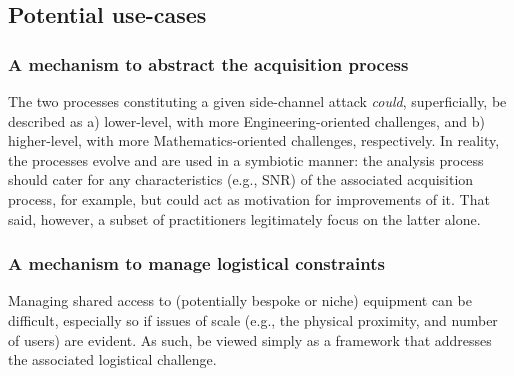 
\subsection{Potential use-cases}


\subsubsection{A mechanism to abstract the acquisition process}

The two processes constituting a given side-channel attack {\em could},
superficially, be described as
a)  lower-level, with more Engineering-oriented challenges,
   and
b) higher-level, with more Mathematics-oriented challenges,
respectively.  
In reality, the processes evolve and are used in a symbiotic manner: the 
analysis process should cater for any characteristics (e.g., SNR) of the 
associated acquisition process, for example, but could act as motivation
for improvements of it.  
That said, however, a subset of practitioners legitimately focus on the
latter alone.



\subsubsection{A mechanism to manage logistical constraints}

Managing shared access to (potentially bespoke or niche) equipment can be 
difficult, especially so if issues of scale (e.g., the physical proximity, 
and number of users) are evident.  As such,  be viewed 
simply as a framework that addresses the associated logistical challenge.

